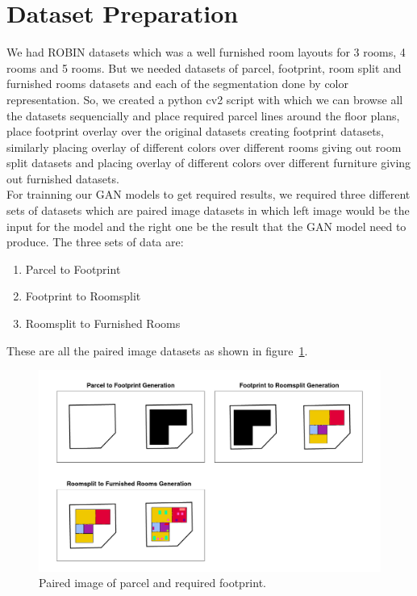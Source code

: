         \section{Dataset Preparation}\label{section:dataset-preparation}
            We had ROBIN datasets which was a well furnished room layouts for 3 rooms, 4 rooms and 5 rooms. But we needed datasets of parcel, footprint, room split and furnished rooms datasets and each of the segmentation done by color representation. So, we created a python cv2 script with which we can browse all the datasets sequencially and place required parcel lines around the floor plans, place footprint overlay over the original datasets creating footprint datasets, similarly placing overlay of different colors over different rooms giving out room split datasets and placing overlay of different colors over different furniture giving out furnished datasets.\\
            For trainning our GAN models to get required results, we required three different sets of datasets which are paired image datasets in which left image would be the input for the model and the right one be the result that the GAN model need to produce. The three sets of data are:
            \begin{enumerate}[label=\alph*.]
                \item Parcel to Footprint
                \item Footprint to Roomsplit
                \item Roomsplit to Furnished Rooms
            \end{enumerate}
            These are all the paired image datasets as shown in figure~\ref{fig:dataset-final-paired}.
            \begin{figure}[h]
                \centering
                    \includegraphics[width=1\linewidth]{img/experiment/dataset/dataset_principal_paired_image.png}
                    \caption{Paired image of parcel and required footprint.}
                    \label{fig:dataset-final-paired}
            \end{figure} 
